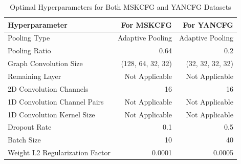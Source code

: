 \begin{table}
    \begin{center}
        \begin{tabular}{l|r|r}
            \hline
            Hyperparameter & For MSKCFG & For YANCFG \\
            \hline
            \hline
            Pooling Type & Adaptive Pooling &  Adaptive Pooling\\
            \hline
            Pooling Ratio & 0.64 & 0.2 \\
            \hline
            Graph Convolution Size & (128, 64, 32, 32) & (32, 32, 32, 32)\\
            \hline
            Remaining Layer & Not Applicable &  Not Applicable \\
            \hline
            2D Convolution Channels & 16 & 16 \\
            \hline
            1D Convolution Channel Pairs & Not Applicable & Not Applicable \\
            \hline
            1D Convolution Kernel Size & Not Applicable & Not Applicable\\
            \hline
            Dropout Rate & 0.1 & 0.5 \\
            \hline
            Batch Size & 10 & 40\\
            \hline
            Weight L2 Regularization Factor & 0.0001 & 0.0005\\
            \hline
        \end{tabular}
        \caption{Optimal Hyperparameters for Both MSKCFG and YANCFG Datasets}
        \label{MG:Tab:BestHyperparameters}
    \end{center}
\end{table}

